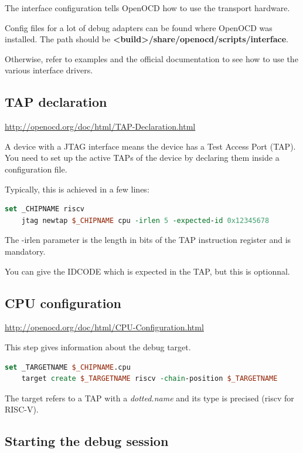\documentclass{article}
\begin{document}
    The interface configuration tells OpenOCD how to use the transport hardware. 
    
    Config files for a lot of debug adapters can be found where OpenOCD was installed. The path should be \textbf{<build>/share/openocd/scripts/interface}.
    
    Otherwise, refer to examples and the official documentation to see how to use the various interface drivers.
    
    \subsection{TAP declaration}
    
    \url{http://openocd.org/doc/html/TAP-Declaration.html}
    
    A device with a JTAG interface means the device has a Test Access Port (TAP). You need to set up the active TAPs of the device by declaring them inside a configuration file.
    
    Typically, this is achieved in a few lines:
    
    \begin{lstlisting}[language=tcl]
    set _CHIPNAME riscv
    jtag newtap $_CHIPNAME cpu -irlen 5 -expected-id 0x12345678
    \end{lstlisting}
    
    The -irlen parameter is the length in bits of the TAP instruction register and is mandatory.
    
    You can give the IDCODE which is expected in the TAP, but this is optionnal.
    
    \subsection{CPU configuration}
    
    \url{http://openocd.org/doc/html/CPU-Configuration.html}
    
    This step gives information about the debug target.
    
    \begin{lstlisting}[language=tcl]
    set _TARGETNAME $_CHIPNAME.cpu
    target create $_TARGETNAME riscv -chain-position $_TARGETNAME
    \end{lstlisting}
    
    The target refers to a TAP with a \textit{dotted.name} and its type is precised (riscv for RISC-V).
    
    \subsection{Starting the debug session}
    
\end{document}
